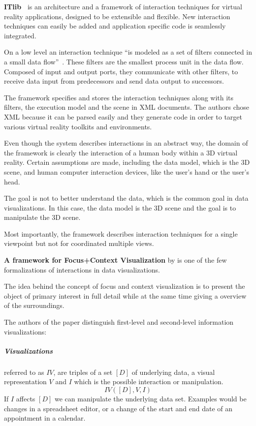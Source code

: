 \textbf{ITlib~\parencite{Figueroa2001}} is an architecture and a framework of interaction techniques for virtual reality applications, designed to be extensible and flexible.
New interaction techniques can easily be added and application specific code is seamlessly integrated.

On a low level an interaction technique ``is modeled as a set of filters connected in a small data flow''~\parencite[p.~2]{Figueroa2001}.
These filters are the smallest process unit in the data flow.
Composed of input and output ports, they communicate with other filters, to receive data input from predecessors and send data output to successors.

The framework specifies and stores the interaction techniques along with its filters, the execution model and the scene in XML documents.
The authors chose XML because it can be parsed easily and they generate code in order to target various virtual reality toolkits and environments.

Even though the system describes interactions in an abstract way, the domain of the framework is clearly the interaction of a human body within a 3D virtual reality.
Certain assumptions are made, including the data model, which is the 3D scene, and human computer interaction devices, like the user's hand or the user's head.

The goal is not to better understand the data, which is the common goal in data visualizations.
In this case, the data model is the 3D scene and the goal is to manipulate the 3D scene.

Most importantly, the framework describes interaction techniques for a single viewpoint but not for coordinated multiple views.

\textbf{A framework for Focus+Context Visualization} by \textcite{Bjork1999} is one of the few formalizations of interactions in data visualizations.

The idea behind the concept of focus and context visualization is to present the object of primary interest in full detail while at the same time giving a overview of the surroundings.

The authors of the paper distinguish first-level and second-level information visualizations:
\subparagraph{Visualizations} referred to as $IV$, are triples of a set $[D]$ of underlying data, a visual representation $V$ and $I$ which is the possible interaction or manipulation.
\begin{equation}
  IV([D], V, I)
\end{equation}
If $I$ affects $[D]$ we can manipulate the underlying data set.
Examples would be changes in a spreadsheet editor, or a change of the start and end date of an appointment in a calendar.

